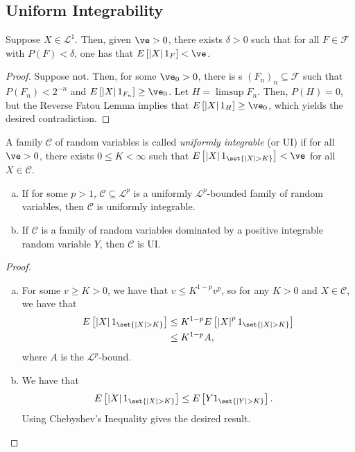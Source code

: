 \documentclass[10pt]{mypackage}
\begin{document}
\subsection{Uniform Integrability}%
\begin{lemma}
  Suppose $X\in \mathcal{L}^1$. Then, given $\ve > 0$, there exists $\delta > 0$ such that for all $F\in \mathcal{F}$ with $P(F) < \delta$, one has that $ E\left[ \left\vert X \right\vert1_{F} \right] < \ve $.
\end{lemma}
\begin{proof}
  Suppose not. Then, for some $\ve_0 > 0$, there is s $\left( F_n \right)_{n}\subseteq \mathcal{F}$ such that $P\left( F_n \right) < 2^{-n}$ and $E\left[ \left\vert X \right\vert1_{F_n} \right] \geq \ve_0$. Let $H = \limsup F_n$. Then, $P(H) = 0$, but the Reverse Fatou Lemma implies that $E\left[ \left\vert X \right\vert1_H \right]\geq \ve_0$, which yields the desired contradiction.
\end{proof}
\begin{definition}
  A family $ \mathcal{C} $ of random variables is called \textit{uniformly integrable} (or UI) if for all $\ve > 0$, there exists $0 \leq K < \infty$ such that $E\left[ \left\vert X \right\vert1_{\set{\left\vert X \right\vert > K}} \right] < \ve$ for all $X\in \mathcal{C}$.
\end{definition}
\begin{theorem}\hfill
  \begin{enumerate}[(a)]
    \item If for some $ p > 1$, $ \mathcal{C} \subseteq \mathcal{L}^p$ is a uniformly $ \mathcal{L}^p $-bounded family of random variables, then $ \mathcal{C} $ is uniformly integrable.
    \item If $\mathcal{C}$ is a family of random variables dominated by a positive integrable random variable $Y$, then $\mathcal{C}$ is UI.
  \end{enumerate}
\end{theorem}
\begin{proof}\hfill
  \begin{enumerate}[(a)]
    \item For some $v \geq K > 0$, we have that $v\leq K^{1-p}v^{p}$, so for any $K > 0$ and $X\in \mathcal{C}$, we have that
      \begin{align*}
        E\left[ \left\vert X \right\vert1_{\set{\left\vert X \right\vert > K}} \right] &\leq K^{1-p}E\left[ \left\vert X \right\vert^{p}1_{\set{\left\vert X \right\vert > K}} \right]\\
                                                                                       &\leq K^{1-p}A,
      \end{align*}
      where $A$ is the $ \mathcal{L}^p $-bound.
    \item We have that
      \begin{align*}
        E\left[ \left\vert X \right\vert1_{\set{\left\vert X \right\vert > K}} \right] &\leq E\left[ Y1_{\set{\left\vert Y \right\vert > K}} \right].
      \end{align*}
      Using Chebyshev's Inequality gives the desired result.
  \end{enumerate}
\end{proof}
\end{document}

